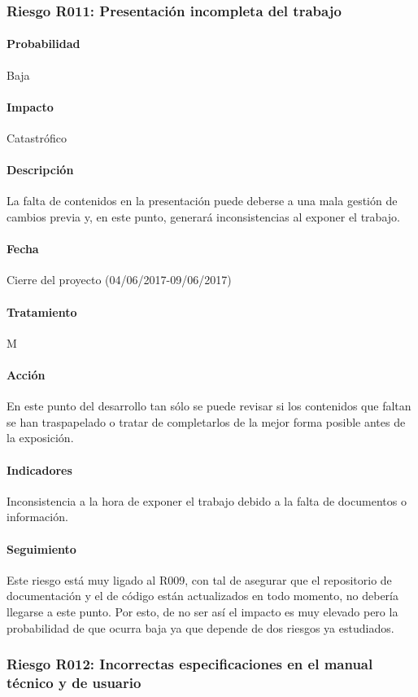 \documentclass[10pt,a4paper]{article}
\begin{document}
                \subsubsection{Riesgo R011: Presentación incompleta del trabajo}
				\paragraph{Probabilidad} Baja
				\paragraph{Impacto}	Catastrófico
				\paragraph{Descripción} La falta de contenidos en la presentación puede deberse a una mala gestión de cambios previa y, en este punto, generará inconsistencias al exponer el trabajo.
				\paragraph{Fecha} Cierre del proyecto (04/06/2017-09/06/2017)
				\paragraph{Tratamiento} M
				\paragraph{Acción} En este punto del desarrollo tan sólo se puede revisar si los contenidos que faltan se han traspapelado o tratar de completarlos de la mejor forma posible antes de la exposición.
				\paragraph{Indicadores} Inconsistencia a la hora de exponer el trabajo debido a la falta de documentos o información.
				\paragraph{Seguimiento}	Este riesgo está muy ligado al R009, con tal de asegurar que el repositorio de documentación y el de código están actualizados en todo momento, no debería llegarse a este punto. Por esto, de no ser así el impacto es muy elevado pero la probabilidad de que ocurra baja ya que depende de dos riesgos ya estudiados.			
				
				\subsubsection{Riesgo R012: Incorrectas especificaciones en el manual técnico y de usuario}
\end{document}

